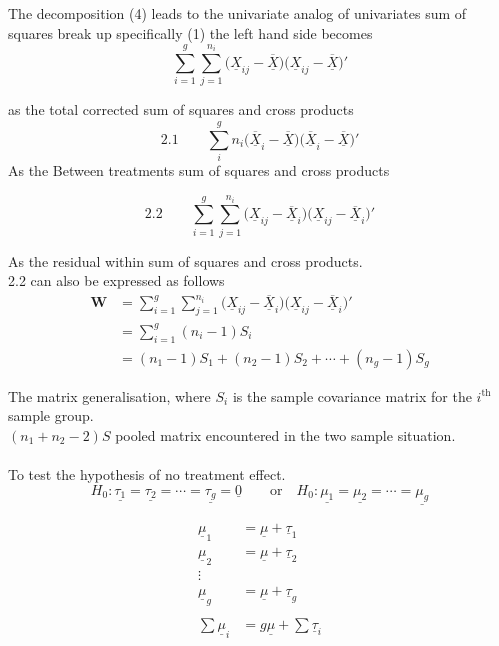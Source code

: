 \documentclass[11pt,a4paper]{article}
\theoremstyle{definition}
\begin{document}
The decomposition (4) leads to the univariate analog of univariates sum of squares break up specifically (1) the left hand side becomes $$\sum^g_{i=1}\sum^{n_i}_{j=1}\big(\underline{X}_{ij}-\underline{\overline{X}}\big)\big(\underline{X}_{ij}-\overline{\underline{X}}\big)'$$

as the total corrected sum of squares and cross products\\

\begin{equation}\tag{5}
2.1\qquad  \sum^g_{i}n_i\big(\overline{\underline{X}}_i-\overline{\underline{X}}\big)\big(\overline{\underline{X}}_i-\overline{\underline{X}}\big)'
\end{equation}
As the Between treatments sum of  squares and cross products 
 
\begin{equation}\tag{6}
2.2\qquad  \sum^g_{i=1}\sum^{n_i}_{j=1}\big(\underline{X}_{ij}-\overline{\underline{X}}_i\big)\big(\underline{X}_{ij}-\overline{\underline{X}}_i\big)'
\end{equation}

As the residual within sum of squares and cross products.\\

2.2 can also be expressed as follows
\begin{align*}
\textbf{W} & = \sum^g_{i=1}\sum^{n_i}_{j=1}\big(\underline{X}_{ij}-\overline{\underline{X}}_i\big)\big(\underline{X}_{ij}-\overline{\underline{X}}_i\big)'\\
& = \sum^g_{i=1}(n_i-1)S_i\\
& = (n_1-1)S_1 + (n_2-1)S_2 + \cdots+ (n_g-1)S_g\tag{7}
\end{align*}

The matrix generalisation, where $S_i$ is the sample covariance matrix for the $i^{\text{th}}$ sample group.\\

$(n_1+n_2-2)S$ pooled matrix encountered in the two sample situation.\\\\

To test the hypothesis of no treatment effect.
$$H_0: \underline{\tau_1} = \underline{\tau_2} = \cdots= \underline{\tau_g}=\underline{0} \qquad \text{or}\quad  H_0: \underline{\mu_1} = \underline{\mu_2}=\cdots= \underline{\mu_g}$$

\begin{align*}
\underline{\mu}_1 & = \underline{\mu} + \underline{\tau}_1\\
\underline{\mu}_2 & = \underline{\mu} + \underline{\tau}_2\\
\vdots & \\
\underline{\mu}_g & = \underline{\mu} + \underline{\tau}_g\\\\
\sum \underline{\mu}_i & = g\underline{\mu} + \sum \underline{\tau}_i
\end{align*}
\end{document}
